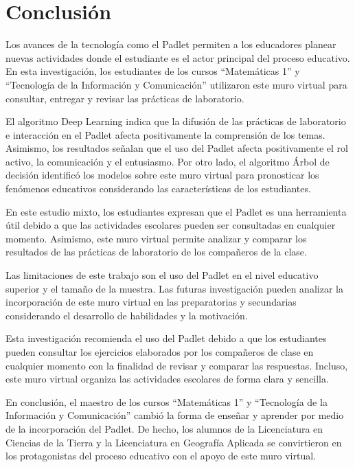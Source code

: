 \documentclass[spanish]{textolivre}
\begin{document}
\section{Conclusión}

Los avances de la tecnología como el Padlet permiten a los educadores planear nuevas actividades donde el estudiante es el actor principal del proceso educativo. En esta investigación, los estudiantes de los cursos “Matemáticas 1” y “Tecnología de la Información y Comunicación” utilizaron este muro virtual para consultar, entregar y revisar las prácticas de laboratorio.

El algoritmo Deep Learning indica que la difusión de las prácticas de laboratorio e interacción en el Padlet afecta positivamente la comprensión de los temas. Asimismo, los resultados señalan que el uso del Padlet afecta positivamente el rol activo, la comunicación y el entusiasmo. Por otro lado, el algoritmo Árbol de decisión identificó los modelos sobre este muro virtual para pronosticar los fenómenos educativos considerando las características de los estudiantes.

En este estudio mixto, los estudiantes expresan que el Padlet es una herramienta útil debido a que las actividades escolares pueden ser consultadas en cualquier momento. Asimismo, este muro virtual permite analizar y comparar los resultados de las prácticas de laboratorio de los compañeros de la clase.

Las limitaciones de este trabajo son el uso del Padlet en el nivel educativo superior y el tamaño de la muestra. Las futuras investigación pueden analizar la incorporación de este muro virtual en las preparatorias y secundarias considerando el desarrollo de habilidades y la motivación.

Esta investigación recomienda el uso del Padlet debido a que los estudiantes pueden consultar los ejercicios elaborados por los compañeros de clase en cualquier momento con la finalidad de revisar y comparar las respuestas. Incluso, este muro virtual organiza las actividades escolares de forma clara y sencilla.

En conclusión, el maestro de los cursos “Matemáticas 1” y “Tecnología de la Información y Comunicación” cambió la forma de enseñar y aprender por medio de la incorporación del Padlet. De hecho, los alumnos de la Licenciatura en Ciencias de la Tierra y la Licenciatura en Geografía Aplicada se convirtieron en los protagonistas del proceso educativo con el apoyo de este muro virtual.
\end{document}
